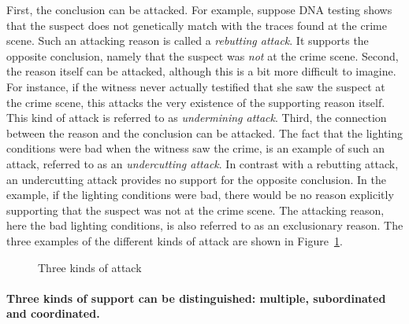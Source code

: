 \documentclass[10pt]{article}
\begin{document}
First, the conclusion can be attacked. %
For example, suppose DNA testing shows that the suspect does not genetically match 
with the traces found at the crime scene. 
Such an attacking reason is called a \textit{rebutting attack}. 
It supports the opposite conclusion, namely that the suspect was \textit{not} 
at the crime scene. 
%
Second, the reason itself can be attacked, although this is a bit more difficult to imagine. 
 For instance, %
 if the witness never actually testified that she saw the suspect at the crime scene, this attacks the very 
 existence of the supporting reason itself. 
 This kind of attack is referred to as \textit{undermining attack}. 
%
Third, the connection between the reason and the conclusion can be attacked.
 The fact that the lighting conditions were bad when the witness saw the crime, 
 is an example of such an attack, referred to as an \textit{undercutting attack}.
 In contrast with a rebutting attack, an undercutting attack provides no support for the opposite conclusion. In the example, %
 if the lighting conditions were bad, there would be no reason explicitly 
 supporting that the suspect was not at the crime scene. The attacking reason, %
 here the bad lighting conditions, is also referred to as an exclusionary reason. 
%
The three examples of the different kinds of attack are shown in Figure~\ref{fig:arg3}.

\begin{figure}[bt]
\centering

\caption{Three kinds of attack\label{fig:arg3}}
\end{figure}

\paragraph{Three kinds of support can be distinguished: multiple, subordinated and coordinated.}

\end{document}
